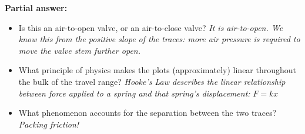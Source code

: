 




\noindent
{\bf Partial answer:}

\begin{itemize}
\item{} Is this an air-to-open valve, or an air-to-close valve? {\it It is air-to-open.  We know this from the positive slope of the traces: more air pressure is required to move the valve stem further open.}
\vskip 10pt
\item{} What principle of physics makes the plots (approximately) linear throughout the bulk of the travel range? {\it Hooke's Law describes the linear relationship between force applied to a spring and that spring's displacement:} $F = kx$
\vskip 10pt
\item{} What phenomenon accounts for the separation between the two traces?  {\it Packing friction!}
\end{itemize}







